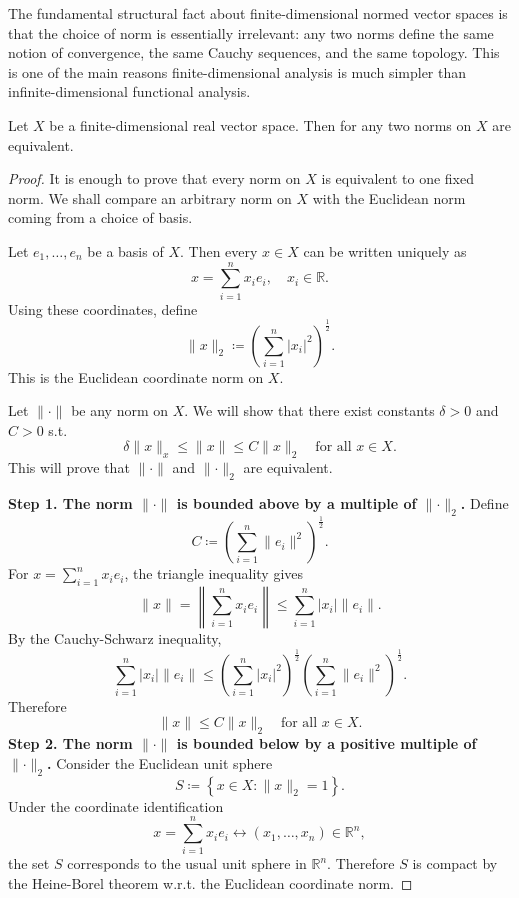 The fundamental structural fact about finite-dimensional normed vector spaces is that the choice of norm is essentially irrelevant: any two norms define the same notion of convergence, the same Cauchy sequences, and the same topology. This is one of the main reasons finite-dimensional analysis is much simpler than infinite-dimensional functional analysis.

\begin{theorem}
    Let \(X\) be a finite-dimensional real vector space. Then for any two norms on \(X\) are equivalent.  
\end{theorem}

\begin{proof}
    It is enough to prove that every norm on \(X\) is equivalent to one fixed norm. We shall compare an arbitrary norm on \(X\) with the Euclidean norm coming from a choice of basis. 

    Let \(e_1, \dots , e_n\) be a basis of \(X\). Then every \(x \in X\) can be written uniquely as 
    \[
        x = \sum_{i=1}^n x_i e_i, \quad x_i \in \mathbb{R}. 
    \]     
    Using these coordinates, define 
    \[
        \lVert x \rVert_2 \coloneqq \left( \sum_{i=1}^n \vert x_i \vert^2   \right)^{\frac{1}{2}}. 
    \]
    This is the Euclidean coordinate norm on \(X\). 

    Let \(\lVert \cdot \rVert \) be any norm on \(X\). We will show that there exist constants \(\delta > 0\) and \(C > 0\) s.t. 
    \[
        \delta \lVert x \rVert_x \le \lVert x \rVert \le C \lVert x \rVert_2 \quad \text{for all } x \in X.    
    \]   
    This will prove that \(\lVert \cdot \rVert \) and \(\lVert \cdot \rVert_2 \) are equivalent.

    \textbf{Step 1. The norm \(\lVert \cdot \rVert \) is bounded above by a multiple of \(\lVert \cdot \rVert_2 \).} 
    Define 
    \[
        C \coloneqq \left( \sum_{i=1}^n \lVert e_i \rVert^2   \right)^{\frac{1}{2}}. 
    \]   
    For \(x = \sum_{i=1}^n x_i e_i \), the triangle inequality gives 
    \[
        \lVert x \rVert = \left\lVert \sum_{i=1}^n x_i e_i  \right\rVert \le \sum_{i=1}^n \vert x_i \vert \lVert e_i \rVert.     
    \] 
    By the Cauchy-Schwarz inequality,
    \[
        \sum_{i=1}^n \vert x_i \vert \lVert e_i \rVert \le \left( \sum_{i=1}^n \vert x_i \vert^2   \right)^{\frac{1}{2}} \left( \sum_{i=1}^n \lVert e_i \rVert^2   \right)^{\frac{1}{2}}.     
    \]
    Therefore 
    \[
        \lVert x \rVert \le C \lVert x \rVert_2 \quad \text{for all } x \in X.   
    \]
    \textbf{Step 2. The norm \(\lVert \cdot \rVert \) is bounded below by a positive multiple of \(\lVert \cdot \rVert_2 \).} Consider the Euclidean unit sphere 
    \[
        S \coloneqq \left\{ x \in X: \lVert x \rVert_2 = 1  \right\}. 
    \] 
    Under the coordinate identification 
    \[
        x = \sum_{i=1}^n x_i e_i \leftrightarrow (x_1, \dots , x_n) \in \mathbb{R} ^n, 
    \]
    the set \(S\) corresponds to the usual unit sphere in \(\mathbb{R} ^n\). Therefore \(S\) is compact by the Heine-Borel theorem w.r.t. the Euclidean coordinate norm. 


\end{proof}
